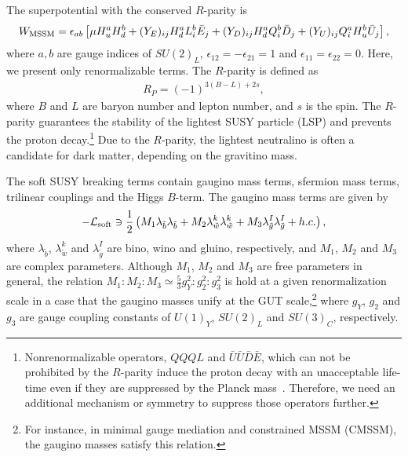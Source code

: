 \documentclass[preprint,3p,12pt]{elsarticle}
\begin{document}
{\vspace{10pt}
The superpotential  with the conserved $R$-parity is 
\begin{eqnarray}
W_{\rm MSSM} = \epsilon_{ab} \left[ \mu H_u^a H_d^b +  (Y_E)_{ij} H_d^a L^b_i \bar E_j
+  (Y_D)_{ij} H_d^a Q^b_i \bar D_j
+  (Y_U)_{ij} Q^a_i H_u^b \bar U_j
\right],
\end{eqnarray}
where $a,b$ are gauge indices of $SU(2)_L$, $\epsilon_{12}=-\epsilon_{21}=1$ and $\epsilon_{11}=\epsilon_{22}=0$. Here, we present only renormalizable terms. The $R$-parity is defined as
\begin{eqnarray}
R_P = (-1)^{3(B-L)+2 s},  
\end{eqnarray}
where $B$ and $L$ are baryon number and lepton number, and $s$ is the spin.
The $R$-parity guarantees the stability of the lightest SUSY particle (LSP) and prevents the proton decay.\footnote{
%
Nonrenormalizable operators, $QQQL$ and $\bar U \bar U \bar D\bar E$, which can not be prohibited by the $R$-parity induce the proton decay with an unacceptable life-time even if they are suppressed by the Planck mass~\cite{Murayama:1994tc,Harnik:2004yp}. Therefore, we need an additional mechanism or symmetry to suppress those operators further. 
%
}
Due to the $R$-parity, the lightest neutralino is often a candidate for dark matter, depending on the gravitino mass. %

The soft SUSY breaking terms contain gaugino mass terms, sfermion mass terms, 
trilinear couplings and the Higgs $B$-term. 
The gaugino mass terms are given by
\begin{eqnarray}
\label{eq:Lsoft_gaugino}
-\mathcal{L}_{\rm soft} \ni  \frac{1}{2} 
\left( M_{1} \lambda_{\tilde b} \lambda_{\tilde b} +  M_{2} \lambda_{\tilde w}^k \lambda_{\tilde w}^k 
+ M_{3} \lambda_{\tilde g}^I \lambda_{\tilde g}^I + h.c. \right),
\end{eqnarray}
where $\lambda_{\tilde b}$, $\lambda_{\tilde w}^k$ and $\lambda_{\tilde g}^I$ are bino, wino and gluino, respectively, and $M_1$, $M_2$ and $M_3$ are complex parameters. Although $M_1$, $M_2$ and $M_3$ are free parameters in general,
the relation $M_1: M_2: M_3 \simeq \frac{5}{3} g_Y^2: g_2^2: g_3^2$ is hold at a given renormalization scale in a case that the gaugino masses unify at the GUT scale,\footnote{
For instance, in minimal gauge mediation and constrained MSSM (CMSSM), the gaugino masses satisfy this relation.
}
where $g_Y$, $g_2$ and $g_3$ are gauge coupling constants of $U(1)_Y$, $SU(2)_L$ and $SU(3)_C$, respectively. 


}
\end{document}
